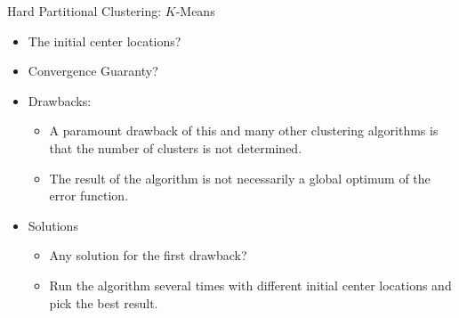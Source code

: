 \documentclass[compress,oilve]{beamer}
\newcommand{\tc}[2]{
	\textcolor{#1}{#2}
}
\begin{document}
\begin{frame}{Hard Partitional Clustering: $K$-Means}
	\begin{itemize}
		\item \tc{keywords}{The initial center locations?}
		
		\medskip
		\item \tc{keywords}{Convergence Guaranty?}
		
		\item \tc{keywords}{Drawbacks:}
		\begin{itemize}
			\item  A paramount drawback of this and many other clustering algorithms is that the number of clusters is not determined.
			
			\medskip
			\item  The result of the algorithm is not necessarily a global optimum of the error function.
		\end{itemize}
	
	\medskip
	\item \tc{keywords}{Solutions}
	\begin{itemize}
		\item Any solution for the first drawback?
		
		\medskip
		\item 	Run the algorithm several times with different initial center locations and pick the best result.
		
	\end{itemize}

	\end{itemize}

\end{frame}
\end{document}
